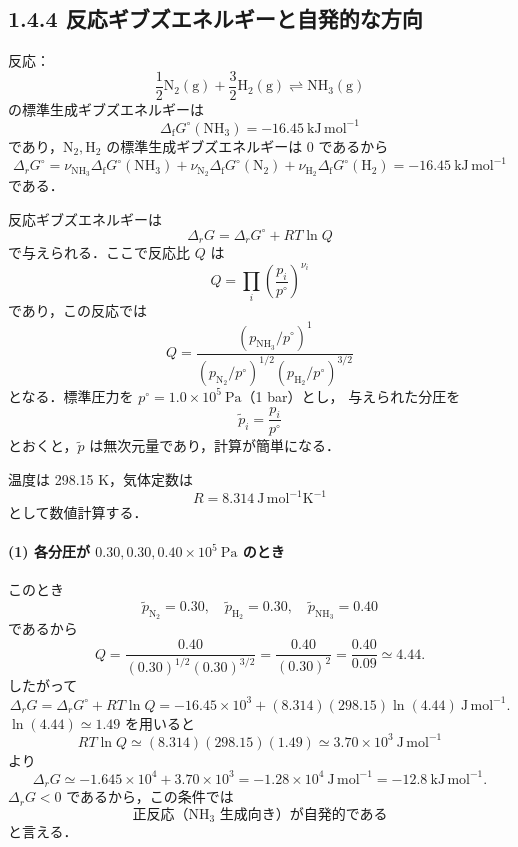 \documentclass[a4paper,12pt]{jlreq}
\begin{document}
\newpage

\subsection*{1.4.4 反応ギブズエネルギーと自発的な方向}

反応：
\[
 \frac12\mathrm{N_2(g)} + \frac32\mathrm{H_2(g)} \rightleftharpoons \mathrm{NH_3(g)}
\]
の標準生成ギブズエネルギーは
\[
 \Delta_{\mathrm f}G^\circ(\mathrm{NH_3}) = -16.45\ \mathrm{kJ\,mol^{-1}}
\]
であり，\(\mathrm{N_2},\mathrm{H_2}\) の標準生成ギブズエネルギーは 0 であるから
\[
 \Delta_r G^\circ
 = \nu_{\mathrm{NH_3}}\Delta_{\mathrm f}G^\circ(\mathrm{NH_3})
   + \nu_{\mathrm{N_2}}\Delta_{\mathrm f}G^\circ(\mathrm{N_2})
   + \nu_{\mathrm{H_2}}\Delta_{\mathrm f}G^\circ(\mathrm{H_2})
 = -16.45\ \mathrm{kJ\,mol^{-1}}
\]
である．  

反応ギブズエネルギーは
\[
 \Delta_r G = \Delta_r G^\circ + RT\ln Q
\]
で与えられる．ここで反応比 \(Q\) は
\[
 Q = \prod_i\left(\frac{p_i}{p^\circ}\right)^{\nu_i}
\]
であり，この反応では
\[
 Q = \frac{(p_{\mathrm{NH_3}}/p^\circ)^1}
           {(p_{\mathrm{N_2}}/p^\circ)^{1/2}(p_{\mathrm{H_2}}/p^\circ)^{3/2}}
\]
となる．標準圧力を \(p^\circ = 1.0\times10^5\ \mathrm{Pa}\)（1 bar）とし，
与えられた分圧を
\[
 \tilde p_i = \frac{p_i}{p^\circ}
\]
とおくと，\(\tilde p\) は無次元量であり，計算が簡単になる．

温度は 298.15 K，気体定数は
\[
 R = 8.314\ \mathrm{J\,mol^{-1}K^{-1}}
\]
として数値計算する．

\paragraph{(1) 各分圧が \(0.30, 0.30, 0.40\times10^5\ \mathrm{Pa}\) のとき}

このとき
\[
 \tilde p_{\mathrm{N_2}} = 0.30,\quad
 \tilde p_{\mathrm{H_2}} = 0.30,\quad
 \tilde p_{\mathrm{NH_3}} = 0.40
\]
であるから
\[
 Q = \frac{0.40}{(0.30)^{1/2}(0.30)^{3/2}}
   = \frac{0.40}{(0.30)^2}
   = \frac{0.40}{0.09}
   \simeq 4.44.
\]
したがって
\[
 \Delta_r G
 = \Delta_r G^\circ + RT\ln Q
 = -16.45\times10^3
   + (8.314)(298.15)\ln(4.44)\ \mathrm{J\,mol^{-1}}.
\]
\(\ln(4.44)\simeq 1.49\) を用いると
\[
 RT\ln Q
 \simeq (8.314)(298.15)(1.49)
 \simeq 3.70\times10^3\ \mathrm{J\,mol^{-1}}
\]
より
\[
 \Delta_r G
 \simeq -1.645\times10^4 + 3.70\times10^3
 = -1.28\times10^4\ \mathrm{J\,mol^{-1}}
 = -12.8\ \mathrm{kJ\,mol^{-1}}.
\]
\(\Delta_r G<0\) であるから，この条件では
\[
 \boxed{\text{正反応（NH\(_3\) 生成向き）が自発的である}}
\]
と言える．
\end{document}
